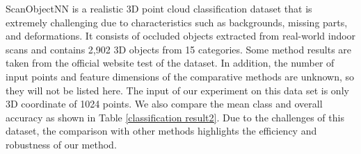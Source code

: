 \documentclass[conference]{IEEEtran}
\begin{document}
ScanObjectNN \cite{uy2019revisiting} is a realistic 3D point cloud classification dataset that is extremely challenging due to characteristics such as backgrounds, missing parts, and deformations. It consists of occluded objects extracted from real-world indoor scans and contains 2,902 3D objects from 15 categories. Some method results are taken from the official website test of the dataset. In addition, the number of input points and feature dimensions of the comparative methods are unknown, so they will not be listed here. The input of our experiment on this data set is only 3D coordinate  of 1024 points. We also compare the mean class and overall accuracy as shown in Table \ref{classification result2}. Due to the challenges of this dataset, the comparison with other methods highlights the efficiency and robustness of our method.
\vspace{-3mm}
\begin{table}[h]
\caption{Classification results on ScanObjectNN.}
\begin{center}
\vspace{-2mm}
\end{center}
\vspace{-2mm}

\label{classification result2}
\end{table}
\end{document}
